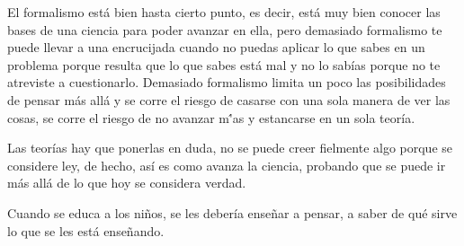 \documentclass[addressstd,a4paper,20pt]{dinbrief}
\begin{document}
El formalismo est\'a bien hasta cierto punto, es decir, est\'a muy bien conocer las bases de una ciencia para poder avanzar en ella, pero demasiado formalismo te puede llevar a una encrucijada cuando no puedas aplicar lo que sabes en un problema porque resulta que lo que sabes est\'a mal y no lo sab\'ias porque no te atreviste a cuestionarlo. Demasiado formalismo limita un poco las posibilidades de pensar m\'as all\'a y se corre el riesgo de casarse con una sola manera de ver las cosas, se corre el riesgo de no avanzar m\''as y estancarse en un sola teor\'ia.

Las teor\'ias hay que ponerlas en duda, no se puede creer fielmente algo porque se considere ley, de hecho, as\'i es como avanza la ciencia, probando que se puede ir m\'as all\'a de lo que hoy se considera verdad.

Cuando se educa a los ni\~nos, se les deber\'ia ense\~nar a pensar, a saber de qu\'e sirve lo que se les est\'a ense\~nando. 
\end{document}
